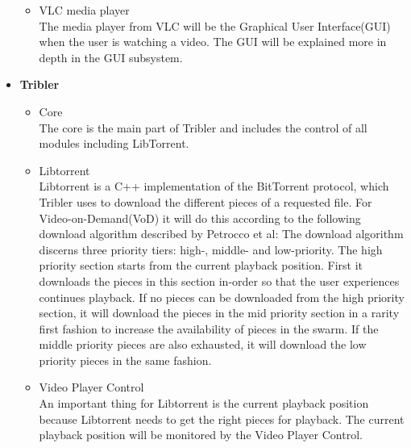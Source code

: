 \begin{itemize}
\begin{itemize}
		\item VLC media player\\
The media player from VLC will be the Graphical User Interface(GUI) when the user is watching a video. The GUI will be explained more in depth in the GUI subsystem.
	\end{itemize}
\item \textbf{Tribler}
	\begin{itemize}
		\item Core\\
The core is the main part of Tribler and includes the control of all modules including LibTorrent.
		\item Libtorrent\\
Libtorrent is a C++ implementation of the BitTorrent protocol, which Tribler uses to download the different pieces of a requested file. For Video-on-Demand(VoD) it will do this according to the following download algorithm described by Petrocco et al\cite{libswift12}: The download algorithm discerns three priority tiers: high-, middle- and low-priority. The high priority section starts from the current playback position. First it downloads the pieces in this section in-order so that the user experiences continues playback. If no pieces can be downloaded from the high priority section, it will download the pieces in the mid priority section in a rarity first fashion to increase the availability of pieces in the swarm. If the middle priority pieces are also exhausted, it will download the low priority pieces in the same fashion. 
		\item Video Player Control\\
An important thing for Libtorrent is the current playback position because Libtorrent needs to get the right pieces for playback. The current playback position will be monitored by the Video Player Control.
	\end{itemize}
\end{itemize}
